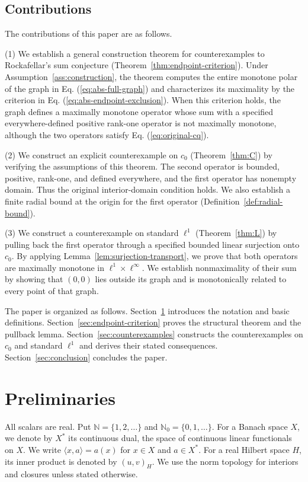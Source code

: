 \documentclass[11pt]{article}
\newcommand{\N}{\mathbb N}
\newcommand{\Nzero}{\mathbb N_0}
\newcommand{\pair}[2]{\langle #1,#2\rangle}
\theoremstyle{definition}
\theoremstyle{remark}
\begin{document}
\subsection{Contributions}
The contributions of this paper are as follows.

(1) We establish a general construction theorem for counterexamples to Rockafellar's sum conjecture (Theorem~\ref{thm:endpoint-criterion}). Under Assumption~\ref{ass:construction}, the theorem computes the entire monotone polar of the graph in Eq. (\ref{eq:abs-full-graph}) and characterizes its maximality by the criterion in Eq. (\ref{eq:abs-endpoint-exclusion}). When this criterion holds, the graph defines a maximally monotone operator whose sum with a specified everywhere-defined positive rank-one operator is not maximally monotone, although the two operators satisfy Eq. (\ref{eq:original-cq}).

(2) We construct an explicit counterexample on $c_0$ (Theorem~\ref{thm:C}) by verifying the assumptions of this theorem. The second operator is bounded, positive, rank-one, and defined everywhere, and the first operator has nonempty domain. Thus the original interior-domain condition holds. We also establish a finite radial bound at the origin for the first operator (Definition~\ref{def:radial-bound}).

(3) We construct a counterexample on standard $\ell^1$ (Theorem~\ref{thm:L}) by pulling back the first operator through a specified bounded linear surjection onto $c_0$. By applying Lemma~\ref{lem:surjection-transport}, we prove that both operators are maximally monotone in $\ell^1\times\ell^\infty$. We establish nonmaximality of their sum by showing that $(0,0)$ lies outside its graph and is monotonically related to every point of that graph. 

The paper is organized as follows. Section~\ref{sec:definitions} introduces the notation and basic definitions. Section~\ref{sec:endpoint-criterion} proves the structural theorem and the pullback lemma. Section~\ref{sec:counterexamples} constructs the counterexamples on $c_0$ and standard $\ell^1$ and derives their stated consequences. Section~\ref{sec:conclusion} concludes the paper.


\section{Preliminaries}
\label{sec:definitions}
All scalars are real. Put $\N=\{1,2,\ldots\}$ and $\Nzero=\{0,1,\ldots\}$. For a Banach space $X$, we denote by $X^*$ its continuous dual, the space of continuous linear functionals on $X$. We write $\pair{x}{a}=a(x)$ for $x\in X$ and $a\in X^*$. For a real Hilbert space $H$, its inner product is denoted by $(u,v)_H$. We use the norm topology for interiors and closures unless stated otherwise.
\end{document}
